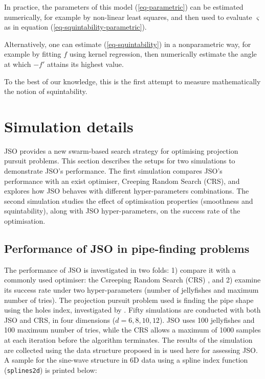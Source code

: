 \documentclass[
  number,
  preprint,
  3p]{elsarticle}
\begin{document}
In practice, the parameters of this model (\ref{eq-parametric}) can be
estimated numerically, for example by non-linear least squares, and then
used to evaluate \(\varsigma\) as in equation
(\ref{eq-squintability-parametric}).

Alternatively, one can estimate (\ref{eq-squintability}) in a
nonparametric way, for example by fitting \(f\) using kernel regression,
then numerically estimate the angle at which \(-f'\) attains its highest
value.

To the best of our knowledge, this is the first attempt to measure
mathematically the notion of squintability.

\section{Simulation details}\label{sec-sim-deets}

JSO provides a new swarm-based search strategy for optimising projection
pursuit problems. This section describes the setups for two simulations
to demonstrate JSO's performance. The first simulation compares JSO's
performance with an exist optimiser, Creeping Random Search (CRS), and
explores how JSO behaves with different hyper-parameters combinations.
The second simulation studies the effect of optimisation properties
(smoothness and squintability), along with JSO hyper-parameters, on the
success rate of the optimisation.

\subsection{Performance of JSO in pipe-finding
problems}\label{sec-app-1}

The performance of JSO is investigated in two folds: 1) compare it with
a commonly used optimiser: the Csreeping Random Search (CRS)
\citep{RJ-2021-105, laa_using_2020}, and 2) examine its success rate
under two hyper-parameters (number of jellyfishes and maximum number of
tries). The projection pursuit problem used is finding the pipe shape
using the holes index, investigated by \citet{laa_using_2020}. Fifty
simulations are conducted with both JSO and CRS, in four dimensions
(\(d = 6, 8, 10, 12\)). JSO uses 100 jellyfishes and 100 maximum number
of tries, while the CRS allows a maximum of 1000 samples at each
iteration before the algorithm terminates. The results of the simulation
are collected using the data structure proposed in \citet{RJ-2021-105}
is used here for assessing JSO. A sample for the sine-wave structure in
6D data using a spline index function (\texttt{splines2d}) is printed
below:
\end{document}

